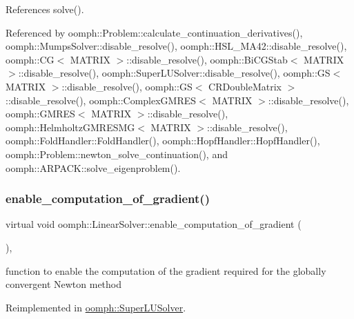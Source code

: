 References solve().



Referenced by oomph\+::\+Problem\+::calculate\+\_\+continuation\+\_\+derivatives(), oomph\+::\+Mumps\+Solver\+::disable\+\_\+resolve(), oomph\+::\+H\+S\+L\+\_\+\+M\+A42\+::disable\+\_\+resolve(), oomph\+::\+C\+G$<$ M\+A\+T\+R\+I\+X $>$\+::disable\+\_\+resolve(), oomph\+::\+Bi\+C\+G\+Stab$<$ M\+A\+T\+R\+I\+X $>$\+::disable\+\_\+resolve(), oomph\+::\+Super\+L\+U\+Solver\+::disable\+\_\+resolve(), oomph\+::\+G\+S$<$ M\+A\+T\+R\+I\+X $>$\+::disable\+\_\+resolve(), oomph\+::\+G\+S$<$ C\+R\+Double\+Matrix $>$\+::disable\+\_\+resolve(), oomph\+::\+Complex\+G\+M\+R\+E\+S$<$ M\+A\+T\+R\+I\+X $>$\+::disable\+\_\+resolve(), oomph\+::\+G\+M\+R\+E\+S$<$ M\+A\+T\+R\+I\+X $>$\+::disable\+\_\+resolve(), oomph\+::\+Helmholtz\+G\+M\+R\+E\+S\+M\+G$<$ M\+A\+T\+R\+I\+X $>$\+::disable\+\_\+resolve(), oomph\+::\+Fold\+Handler\+::\+Fold\+Handler(), oomph\+::\+Hopf\+Handler\+::\+Hopf\+Handler(), oomph\+::\+Problem\+::newton\+\_\+solve\+\_\+continuation(), and oomph\+::\+A\+R\+P\+A\+C\+K\+::solve\+\_\+eigenproblem().

\mbox{\label{classoomph_1_1LinearSolver_a37f1f8b8c6d45115e649739abd5d2f5d}} 
\subsubsection{\texorpdfstring{enable\+\_\+computation\+\_\+of\+\_\+gradient()}{enable\_computation\_of\_gradient()}}
{\footnotesize\ttfamily virtual void oomph\+::\+Linear\+Solver\+::enable\+\_\+computation\+\_\+of\+\_\+gradient (\begin{DoxyParamCaption}{ }\end{DoxyParamCaption})\hspace{0.3cm}{\ttfamily [inline]}, {\ttfamily [virtual]}}



function to enable the computation of the gradient required for the globally convergent Newton method 



Reimplemented in \hyperlink{classoomph_1_1SuperLUSolver_aeb52340bb6d747f60fba9d6c6f9ab2e9}{oomph\+::\+Super\+L\+U\+Solver}.



